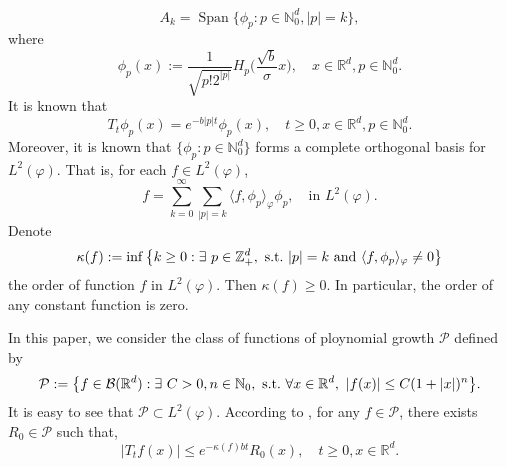 \documentclass[12pt, a4paper]{amsart}
\theoremstyle{definition}
\numberwithin{equation}{section}
\begin{document}
\begin{equation}
    A_k
    = \operatorname{Span} \{\phi_p : p\in \mathbb N_0^d, |p|=k\},
\end{equation}
where
\begin{equation}\label{eigenfunction}
	\phi_p(x)
    := \frac{1}{\sqrt{ p! 2^{|p|} }} H_p \Big(\frac{ \sqrt{b} }{\sigma}x \Big),
    \quad x\in \mathbb{R}^d, p\in \mathbb N_0^d.
\end{equation}
 It is known that
\begin{equation}\label{semigroupformula}
    T_t\phi_p(x)
    =e^{-b|p|t}\phi_p(x),
    \quad t\geq 0, x\in \mathbb{R}^d, p\in \mathbb N_0^d.
\end{equation}
    Moreover, it is known that $\{\phi_p: p \in \mathbb N_0^d\}$ forms a complete orthogonal basis for $L^2(\varphi)$.
    That is, for each $f\in L^2(\varphi)$,
\begin{equation}\label{semicomp1}
    f
    =\sum_{k=0}^{\infty}\sum_{|p|=k}\langle f, \phi_p \rangle_{\varphi} \phi_p,
    \quad \text{in~} L^2(\varphi).
\end{equation}
    Denote
\begin{equation}\label{order}
    \kappa(f)
    :=\inf \left \{k\geq 0: \exists ~ p\in \mathbb{Z}_+^d,{\rm ~s.t.~}|p|=k {\rm ~and~}  \langle f, \phi_p \rangle_{\varphi}\neq 0\right \}
\end{equation}
    the order of function $f$ in $L^2(\varphi)$.
    Then $ \kappa(f)\geq 0$.
    In particular, the order of any constant function is zero.

    In this paper, we consider the class of functions of ploynomial growth $\mathcal{P}$ defined by
\begin{equation}
    \mathcal{P}
    :=\big \{f\in \mathcal{B}(\mathbb{R}^d):\exists~ C>0, n \in \mathbb N_0, {\rm ~s.t.~} \forall x\in \mathbb{R}^d,~ |f(x)|\leq C(1+|x|)^n\big\}.
\end{equation}
    It is easy to see that $\mathcal{P} \subset L^2(\varphi)$.
    According to \cite[Fact 1.2]{MM}, for any $f \in \mathcal{P}$, there exists $R_0 \in \mathcal{P}$ such that,
\begin{equation}
\label{eq:semigroupineq}
    |T_tf(x)|
    \leq e^{-\kappa(f)bt} R_0(x),
    \quad t\geq 0, x\in \mathbb R^d.
\end{equation}
\end{document}
